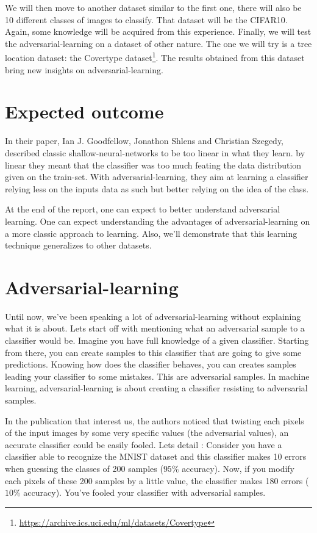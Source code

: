 		We will then move to another dataset similar to the first one, there will also be 10 different classes of images to classify. That dataset will be the CIFAR10\cite{krizhevsky2009learning}. Again, some knowledge will be acquired from this experience. Finally, we will test the adversarial-learning on a dataset of other nature. The one we will try is a tree location dataset: the Covertype dataset\footnote{\url{https://archive.ics.uci.edu/ml/datasets/Covertype}}. The results obtained from this dataset bring new insights on adversarial-learning.

	\section{Expected outcome}
		In their paper, Ian J. Goodfellow, Jonathon Shlens and Christian Szegedy, described classic shallow-neural-networks to be too linear in what they learn. by linear they meant that the classifier was too much feating the data distribution given on the train-set. With adversarial-learning, they aim at learning a classifier relying less on the inputs data as such but better relying on the idea of the class.
		
		At the end of the report, one can expect to better understand adversarial learning. One can expect understanding the advantages of adversarial-learning on a more classic approach to learning. Also, we'll demonstrate that this learning technique generalizes to other datasets.

	\section{Adversarial-learning}
		Until now, we've been speaking a lot of adversarial-learning without explaining what it is about. Lets start off with mentioning what an adversarial sample to a classifier would be. Imagine you have full knowledge of a given classifier. Starting from there, you can create samples to this classifier that are going to give some predictions. Knowing how does the classifier behaves, you can creates samples leading your classifier to some mistakes. This are adversarial samples. In machine learning, adversarial-learning is about creating a classifier resisting to adversarial samples.

		In the publication that interest us\cite{goodfellow2014explaining}, the authors noticed that twisting each pixels of the input images by some very specific values (the adversarial values), an accurate classifier could be easily fooled. Lets detail : Consider you have a classifier able to recognize the MNIST dataset and this classifier makes 10 errors when guessing the classes of 200 samples ($95\%$ accuracy). Now, if you modify each pixels of these 200 samples by a little value, the classifier makes 180 errors ($10\%$ accuracy). You've fooled your classifier with adversarial samples.

